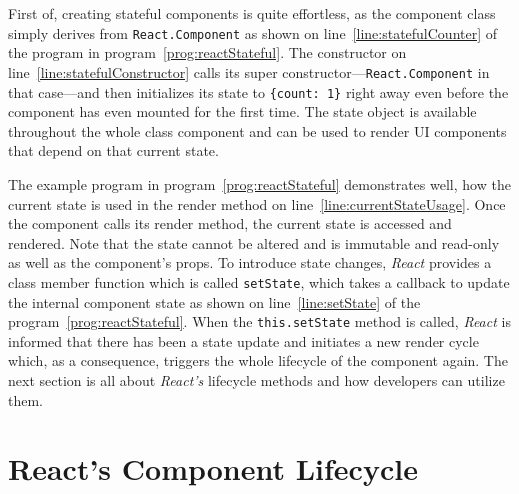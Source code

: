 First of, creating stateful components is quite effortless, as the component class simply derives from \texttt{React.Component} as shown on line~\ref{line:statefulCounter} of the program in program~\ref{prog:reactStateful}. The constructor on line~\ref{line:statefulConstructor} calls its super constructor---\texttt{React.Component} in that case---and then initializes its state to \texttt{\{count: 1\}} right away even before the component has even mounted for the first time. The state object is available throughout the whole class component and can be used to render UI components that depend on that current state.

The example program in program~\ref{prog:reactStateful} demonstrates well, how the current state is used in the render method on line~\ref{line:currentStateUsage}. Once the component calls its render method, the current state is accessed and rendered. Note that the state cannot be altered and is immutable and read-only as well as the component's props. To introduce state changes, \emph{React} provides a class member function which is called \texttt{setState}, which takes a callback to update the internal component state as shown on line~\ref{line:setState} of the program~\ref{prog:reactStateful}. When the \texttt{this.setState} method is called, \emph{React} is informed that there has been a state update and initiates a new render cycle which, as a consequence, triggers the whole lifecycle of the component again. The next section is all about \emph{React's} lifecycle methods and how developers can utilize them.



\section{React's Component Lifecycle}

